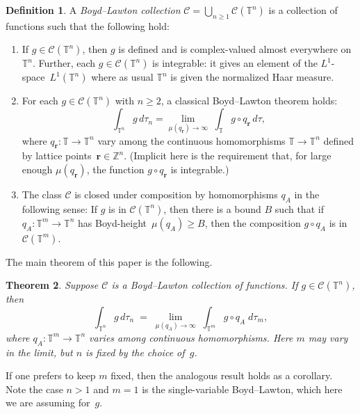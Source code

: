\documentclass[12pt]{amsart}
\theoremstyle{plain}
\newtheorem{theorem}{Theorem}
\theoremstyle{definition}
\newtheorem{definition}[theorem]{Definition}
\theoremstyle{remark}
\numberwithin{theorem}{section}
\numberwithin{equation}{section} %
\newcommand{\bZ}{{\mathbb{Z}}}
\newcommand{\mc}{\mathcal}
\newcommand{\mb}{\mathbf}
\newcommand{\torus}{{\mathbb{T}}}
\begin{document}
\begin{definition} \label{BL collection def}
A \emph{Boyd--Lawton collection} 
 $\mc C = \bigcup_{n \ge 1} \mc C (\torus^n)$ is a collection of functions such that the following hold:
\begin{enumerate}
\item
If $g \in \mc C (\torus^n)$, then $g$ is defined and is complex-valued almost everywhere on $\torus^n$. Further, each $g \in \mc C(\torus^n)$
is integrable: it gives an element of the $L^1$-space~$L^1(\torus^n)$ where as usual $\torus^n$ is given the normalized Haar measure.
\item
For each $g\in \mc C(\torus^n)$ with $n\ge 2$, a classical Boyd--Lawton theorem holds:
$$
\int_{\torus^n}  g \, d\tau_n= \lim_{\mu(q_\mb r)\to \infty}\;  \int_\torus g \circ q_{\mb r} \, d \tau,
$$
where $q_{\mb r} \colon \torus \to \torus^n$ vary among the continuous homomorphisms $\torus \to\torus^n$ defined by lattice points~$\mb r \in \bZ^n$.
(Implicit here is the requirement that, for large enough $\mu\left(q_\mb r\right)$, the function $g \circ q_{\mb r}$ is integrable.)

\item
The class $\mc C$ is closed under composition by homomorphisms $q_{A}$
in the following sense: If $g$ is in $\mc C(\torus^n)$, then there is a bound $B$ such that if $q_A \colon \torus^m \to \torus^n$ has Boyd-height~$\mu (q_A) \ge B$, 
then the composition  $g\circ q_{A}$ is in $\mc C(\torus^m)$.
\end{enumerate}
\end{definition}

The main theorem of this paper is the following.

\begin{theorem} \label{main_theorem}
Suppose $\mc C$ is a Boyd--Lawton collection of functions. If $g \in \mc C (\torus^n)$,
then
$$
\int_{\torus^{n}} g \, d \tau_{n} \; = \;  \lim_{\mu\left( q_A \right)\to \infty}\;  \int_{\torus^m} g \circ q_A \; d \tau_m,
$$
where $q_A\colon \torus^m \to\torus^n$ varies among continuous homomorphisms. Here $m$ may vary in the limit, but $n$ is fixed by the choice of~$g$.%
\end{theorem}


If one prefers to keep $m$ fixed, then the analogous result holds as a corollary. 
Note the
case $n > 1$ and $m=1$ is the single-variable Boyd--Lawton, which here we are assuming for~$g$.
\end{document}
